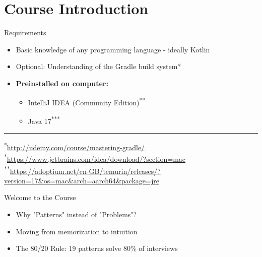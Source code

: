 \section{Course Introduction}

\begin{frame}[c]{\empty}
    \begin{center}
        \Large\textbf{\secname}
    \end{center}
\end{frame}

\begin{frame}{Requirements}
  \begin{itemize}
    \item Basic knowledge of any programming language - ideally Kotlin
    \item Optional: Understanding of the Gradle build system{*}
    \item \textbf{Preinstalled on computer:}
      \begin{itemize}
        \item IntelliJ IDEA (Community Edition)\textsuperscript{**}
        \item Java 17\textsuperscript{***}
      \end{itemize}
  \end{itemize}

  \vspace{2.0cm}
  \hrule
  \vspace{0.3cm}
  \tiny
  \textsuperscript{*}\href{Gradle course}{http://udemy.com/course/mastering-gradle/} \\
  \textsuperscript{*}\href{https://www.jetbrains.com/idea/download/?section=mac}{https://www.jetbrains.com/idea/download/?section=mac} \\
  \textsuperscript{**}\href{https://adoptium.net/en-GB/temurin/releases/?version=17&os=mac&arch=aarch64&package=jre}{https://adoptium.net/en-GB/temurin/releases/?version=17\&os=mac\&arch=aarch64\&package=jre} \\
\end{frame}

\begin{frame}{Welcome to the Course}
  \begin{itemize}
    \item Why "Patterns" instead of "Problems"? 
    \item Moving from memorization to intuition 
    \item The 80/20 Rule: 19 patterns solve 80\% of interviews 
  \end{itemize}
\end{frame}

